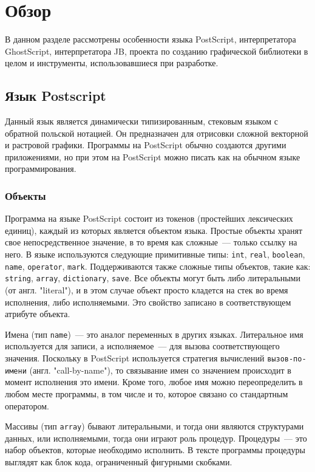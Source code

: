 	\section{Обзор}
	В данном разделе рассмотрены особенности языка PostScript, интерпретатора GhostScript, интерпретатора JB, проекта по созданию графической библиотеки в целом и инструменты, использовавшиеся при разработке.
	\subsection{Язык Postscript}
	Данный язык является динамически типизированным, стековым языком с обратной польской нотацией. Он предназначен для отрисовки сложной векторной и растровой графики. Программы на PostScript обычно создаются другими приложениями, но при этом на PostScript  можно писать как на обычном языке программирования. 
	
	\subsubsection*{Объекты}	
	Программа на языке PostScript состоит из токенов (простейших лексических единиц), каждый из которых является объектом языка. Простые объекты хранят свое непосредственное значение, в то время как сложные~--- только ссылку на него. В языке используются следующие примитивные типы: \texttt{int}, \texttt{real}, \texttt{boolean}, \texttt{name}, \texttt{operator}, \texttt{mark}. Поддерживаются также сложные типы объектов, такие как: \texttt{string}, \texttt{array}, \texttt{dictionary}, \texttt{save}. Все объекты могут быть либо литеральными (от англ. "literal"), и в этом случае объект просто кладется на стек во время исполнения, либо исполняемыми. Это свойство записано в соответствующем атрибуте объекта. 
	
	 Имена (тип \texttt{name})~--- это аналог переменных в других языках. Литеральное имя используется для записи, а исполняемое~--- для вызова соответствующего значения. Поскольку в PostScript используется стратегия вычислений \texttt{вызов-по-имени} (англ. "call-by-name"), то связывание имен со значением происходит в момент исполнения это имени. Кроме того, любое имя можно переопределить в любом месте программы, в том числе и то, которое связано со стандартным оператором. 
	 
	 Массивы (тип \texttt{array}) бывают литеральными, и тогда они являются структурами данных, или исполняемыми, тогда они играют роль процедур. Процедуры~--- это набор объектов, которые необходимо исполнить. В тексте программы процедуры выглядят как блок кода, ограниченный фигурными скобками.
	 
